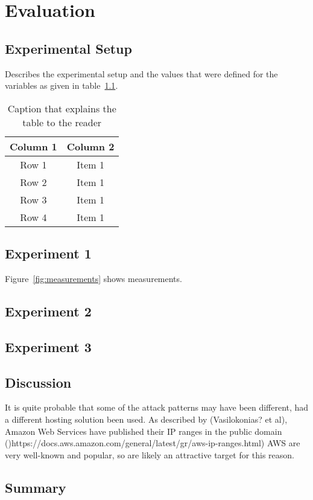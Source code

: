 

\chapter{Evaluation}


\section{Experimental Setup}

Describes the experimental setup and the values that were defined for the variables as given in table~\ref{table:experimentsetup}.

\begin{table}[!h]
	\begin{center}
		\begin{tabular}{|c|c|} 
			\hline
			\bf Column 1  & \bf Column 2   \\
			\hline
			Row 1 & Item 1  \\
			Row 2 & Item 1  \\
			Row 3 & Item 1  \\
			Row 4 & Item 1  \\
			\hline
		\end{tabular}
	\end{center}
	\caption[Variables of the experiment]{Caption that explains the table to the reader}	
	\label{table:experimentsetup}
\end{table}


\section{Experiment 1}

Figure~\ref{fig:measurements} shows measurements.


\section{Experiment 2}

\section{Experiment 3}

\section{Discussion}

It is quite probable that some of the attack patterns may have been different, had a different hosting solution been used. As described by (Vasilokonias? et al), Amazon Web Services have published their IP ranges in the public domain ()https://docs.aws.amazon.com/general/latest/gr/aws-ip-ranges.html)
AWS are very well-known and popular, so are likely an attractive target for this reason.


\section{Summary}